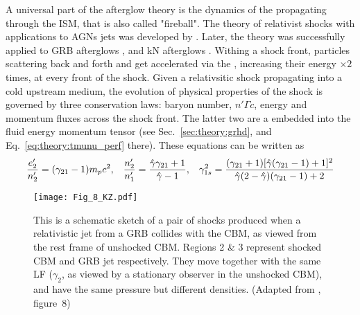 A universal part of the afterglow theory is the dynamics of the \trans{} 
\blast{} propagating through the \ac{ISM}, that is also called "fireball".
%
The theory of relativist shocks with applications to \acp{AGN} jets was 
developed by \citep{Blandford:1976}. Later, the theory was successfully 
applied to \ac{GRB} afterglows \citep{Costa:1997cg,vanParadijs:1997wr,Frail:1997qf},
and \ac{kN} afterglows \citep[\eg]{Nakar:2011cw,Hotokezaka:2015eja,Hotokezaka:2018gmo}.
%
%
Withing a shock front, particles scattering back and forth and get accelerated 
via the , increasing their energy ${\times}2$ 
times, at every front of the shock.
%
Given a relativsitic shock propagating into a cold upstream medium, 
the evolution of physical properties of the shock is governed by three conservation
laws:  baryon number, $n' \Gamma c$, energy and momentum fluxes across the shock front.
%
The latter two are a embedded into the fluid energy momentum tensor 
(see Sec.~\ref{sec:theory:grhd}, and Eq.~\ref{eq:theory:tmunu_perf} there).
%
These equations can be written as 
%
\begin{equation} %
\frac{e_2'}{n_2'} = (\gamma_{21} - 1)m_p c^2, \hspace{3mm}
\frac{n_2'}{n_1'} = \frac{\hat{\gamma}\gamma_{21} + 1}{\hat{\gamma}-1}, \hspace{3mm}
\gamma_{1s}^2 = \frac{(\gamma_{21} + 1) [\hat{\gamma}(\gamma_{21}-1)+1]^2}{\hat{\gamma}(2-\hat{\gamma})(\gamma_{21}-1)+2}
\label{eq:afterglow:blast}
\end{equation} %
%
\begin{figure*}[t]
    \centering 
    \texttt{[image: Fig\_8\_KZ.pdf]}
    \caption{
        This is a schematic sketch of a pair of shocks produced when a relativistic
        jet from a \ac{GRB} collides with the \ac{CBM}, as viewed from the
        rest frame of unshocked \ac{CBM}. Regions 2 \& 3 represent shocked \ac{CBM} and \ac{GRB}
        jet respectively. They move together with the same \ac{LF} ($\gamma_2$, as viewed
        by a stationary observer in the unshocked \ac{CBM}), and have the same pressure but
        different densities.
        (Adapted from \citet{Kumar:2014upa}, figure~8)
    }
    \label{fig:aafg:theory:sr8}
\end{figure*}
